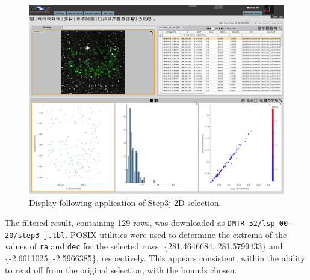 \begin{figure}
  \includegraphics[width=\linewidth]{lsp-00-20/step3-j2.png}
  \caption{Display following application of Step3j 2D selection.}
  \label{fig:lsp-00-20-rect-selected}
\end{figure}

The filtered result, containing 129 rows, was downloaded as \verb|DMTR-52/lsp-00-20/step3-j.tbl|.
POSIX utilities were used to determine the extrema of the values of \verb|ra| and \verb|dec| for the selected rows:
\{281.4646684, 281.5799433\} and \{-2.6611025, -2.5966385\}, respectively.
This appears consistent, within the ability to read off from the original selection, with the bounds chosen.
